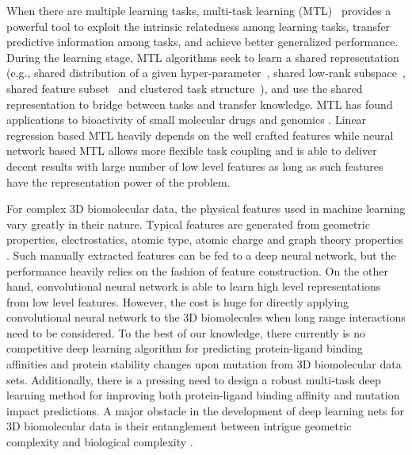 \documentclass[10pt]{article}
\begin{document}
When there are multiple learning tasks,   multi-task learning (MTL)~\cite{evgeniou2004regularized,caruana1998multitask} provides a powerful tool to exploit the intrinsic relatedness among learning tasks, transfer predictive information among tasks, and achieve better generalized performance. During the learning stage, MTL algorithms seek to learn a shared representation (e.g., shared distribution of a given hyper-parameter~\cite{evgeniou2004regularized}, shared low-rank subspace~\cite{evgeniou2007multi,pong2010trace}, shared feature subset~\cite{liu2009multi} and clustered task structure~\cite{zhou2011clustered}), and use the shared representation to bridge between tasks and transfer knowledge. 
MTL has found applications to   bioactivity of small molecular drugs  \cite{hughes2015modeling,unterthiner2015toxicity,lusci2013deep,wallach2015atomnet} and genomics \cite{dahl2014multi, ramsundar2015massively}. Linear regression based MTL heavily depends on the well crafted features while neural network based MTL allows more flexible task coupling and is able to deliver decent results with large number of low level features as long as such features have the representation power of the problem.

For complex 3D biomolecular data, the physical features used in machine learning vary greatly in their nature. Typical features are generated from  geometric properties, electrostatics, atomic type, atomic charge and graph theory properties  \cite{BaoWang:2016HPK}. 
Such manually extracted features can be fed to a deep neural network, but the performance heavily relies on the fashion of feature construction. On the other hand, convolutional neural network is able to learn high level representations from low level features. However, the cost is huge for directly applying convolutional neural network to the 3D biomolecules when long range interactions need to be considered.
To the best of our knowledge, there currently is no competitive deep learning algorithm for predicting protein-ligand binding affinities and protein stability changes upon mutation from 3D biomolecular data sets.    Additionally, there is a pressing need to design a robust  multi-task deep learning method for improving both protein-ligand binding affinity and mutation impact predictions.
 A major obstacle in the development of deep learning nets for 3D biomolecular data is their entanglement between 
intrigue geometric complexity and  biological complexity \cite{ZYu:2008, XFeng:2012a,QZheng:2012,NKWH07,JLi:2013}. 
\end{document}
